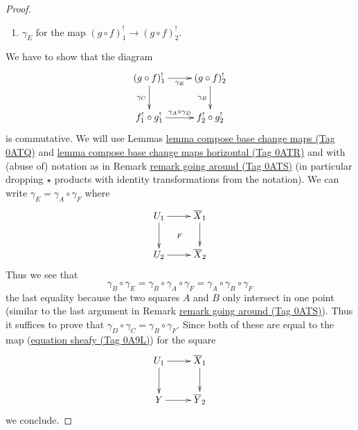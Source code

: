 \documentclass{amsart}
\theoremstyle{plain}
\theoremstyle{definition}
\theoremstyle{remark}
\numberwithin{equation}{subsection}
\begin{document}
\begin{proof}
\begin{enumerate}
\item $\gamma_E$ for the map $(g \circ f)^!_1 \to (g \circ f)^!_2$.
\end{enumerate}
We have to show that the diagram
$$
\xymatrix{
(g \circ f)^!_1 \ar[r]_{\gamma_E} \ar[d]_{\gamma_C} &
(g \circ f)^!_2 \ar[d]_{\gamma_B} \\
f_1^! \circ g_1^! \ar[r]^{\gamma_A \circ \gamma_D} & f_2^! \circ g_2^!
}
$$
is commutative. We will use
Lemmas \href{https://stacks.math.columbia.edu/tag/0ATQ}{lemma compose base change maps (Tag 0ATQ)} and
\href{https://stacks.math.columbia.edu/tag/0ATR}{lemma compose base change maps horizontal (Tag 0ATR)}
and with (abuse of) notation as in
Remark \href{https://stacks.math.columbia.edu/tag/0ATS}{remark going around (Tag 0ATS)} (in particular
dropping $\star$ products with identity transformations
from the notation).
We can write $\gamma_E = \gamma_A \circ \gamma_F$ where
$$
\xymatrix{
U_1 \ar[r] \ar[d] \ar@{}[rd]|F & \overline{X}_1 \ar[d] \\
U_2 \ar[r] & \overline{X}_2
}
$$
Thus we see that
$$
\gamma_B \circ \gamma_E = \gamma_B \circ \gamma_A  \circ \gamma_F
= \gamma_A \circ \gamma_B \circ \gamma_F
$$
the last equality because the two squares $A$ and $B$ only
intersect in one point (similar to the last argument in
Remark \href{https://stacks.math.columbia.edu/tag/0ATS}{remark going around (Tag 0ATS)}). Thus it suffices to prove that
$\gamma_D \circ \gamma_C = \gamma_B \circ \gamma_F$.
Since both of these are equal to the map (\href{https://stacks.math.columbia.edu/tag/0A9L}{equation sheafy (Tag 0A9L)})
for the square
$$
\xymatrix{
U_1 \ar[r] \ar[d] & \overline{X}_1 \ar[d] \\
Y \ar[r] & \overline{Y}_2
}
$$
we conclude.
\end{proof}
\end{document}
